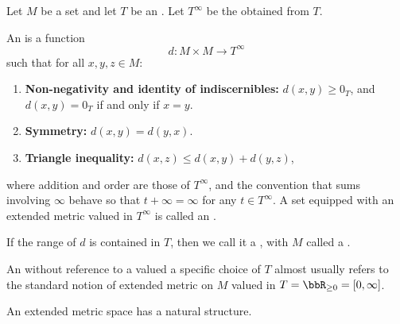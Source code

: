 \begin{definition} \label{definition:extended_metric_on_a_set_valued_in_an_ordered_commutative_monoid_with_adjoined_infinity}
    Let $M$ be a set and let $T$ be an . Let $T^\infty$ be the  obtained from $T$.

    An  is a function
    $$d : M \times M \to T^\infty$$
    such that for all $x,y,z \in M$:
    \begin{enumerate}
        \item \textbf{Non-negativity and identity of indiscernibles:} \quad $d(x,y) \geq 0_T$, and $d(x,y) = 0_T$ if and only if $x = y$.
        \item \textbf{Symmetry:} \quad $d(x,y) = d(y,x)$.
        \item \textbf{Triangle inequality:} \quad $d(x,z) \leq d(x,y) + d(y,z)$,
    \end{enumerate}
    where addition and order are those of $T^\infty$, and the convention that sums involving $\infty$ behave so that $t + \infty = \infty$ for any $t \in T^\infty$. A set equipped with an extended metric valued in $T^\infty$ is called an .

    If the range of $d$ is contained in $T$, then we call it a , with $M$ called a .

    An  without reference to a valued a specific choice of $T$ almost usually refers to the standard notion of extended metric on $M$ valued in $T = \bbR_{\geq 0} = [0,\infty]$. 

    An extended metric space has a natural  structure.
\end{definition}
